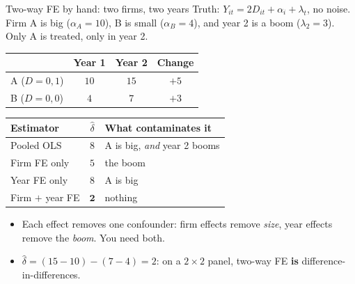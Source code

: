 \documentclass[
  11pt,
  ignorenonframetext,
  aspectratio=169,
]{beamer}
\providecommand{\tightlist}{%
  \setlength{\itemsep}{0pt}\setlength{\parskip}{0pt}}
\begin{document}
\begin{frame}{Two-way FE by hand: two firms, two years}
\protect{}\label{two-way-fe-by-hand-two-firms-two-years}
Truth: \(Y_{it} = 2D_{it} + \alpha_i + \lambda_t\), no noise. Firm A is
big (\(\alpha_A = 10\)), B is small (\(\alpha_B = 4\)), and year 2 is a
boom (\(\lambda_2 = 3\)). Only A is treated, only in year 2.

\begin{center}\footnotesize
\begin{minipage}[t]{0.37\linewidth}\centering
\begin{tabular}{lccc}
\toprule
 & Year 1 & Year 2 & Change \\
\midrule
A \;($D = 0, 1$) & $10$ & $15$ & $+5$ \\
B \;($D = 0, 0$) & $4$ & $7$ & $+3$ \\
\bottomrule
\end{tabular}
\end{minipage}\hfill
\begin{minipage}[t]{0.58\linewidth}\centering
\begin{tabular}{lcl}
\toprule
Estimator & $\hat\delta$ & What contaminates it \\
\midrule
Pooled OLS & $8$ & A is big, \emph{and} year 2 booms \\
Firm FE only & $5$ & the boom \\
Year FE only & $8$ & A is big \\
Firm $+$ year FE & $\mathbf{2}$ & nothing \\
\bottomrule
\end{tabular}
\end{minipage}
\end{center}

\begin{itemize}
\tightlist
\item
  Each effect removes one confounder: firm effects remove \emph{size},
  year effects remove the \emph{boom}. You need both.
\item
  \(\hat\delta = (15 - 10) - (7 - 4) = 2\): on a \(2 \times 2\) panel,
  two-way FE \textbf{is} difference-in-differences.
\end{itemize}
\end{frame}
\end{document}
